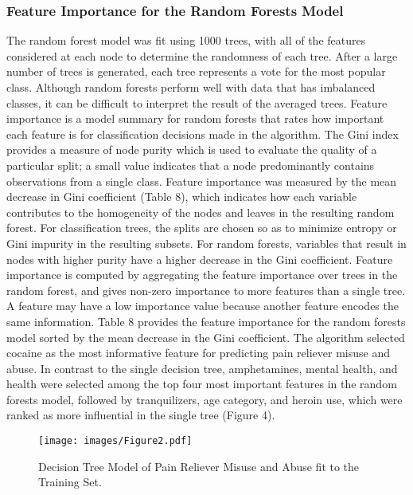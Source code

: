\documentclass[sigconf]{acmart}
\begin{document}
\subsubsection{Feature Importance for the Random Forests Model}

The random forest model was fit using 1000 trees, with all of the features 
considered at each node to determine the randomness of each tree. After a 
large number of trees is generated, each tree represents a vote for the
most popular class. Although random forests perform well with data that has
imbalanced classes, it can be difficult to interpret the result of the 
averaged trees. Feature importance is a model summary for random forests 
that rates how important each feature is for classification decisions made 
in the algorithm. The Gini index provides a measure of node purity which is 
used to evaluate the quality of a particular split; a small value indicates 
that a node predominantly contains observations from a single class. 
Feature importance was measured by the mean decrease in Gini coefficient 
(Table 8), which indicates how each variable contributes to the homogeneity 
of the nodes and leaves in the resulting random forest. For classification 
trees, the splits are chosen so as to minimize entropy or Gini impurity in 
the resulting subsets. For random forests, variables that result in nodes 
with higher purity have a higher decrease in the Gini coefficient. Feature 
importance is computed by aggregating the feature importance over trees in 
the random forest, and gives non-zero importance to more features than a 
single tree. A feature may have a low importance value because another feature 
encodes the same information. Table 8 provides the feature importance for 
the random forests model sorted by the mean decrease in the Gini coefficient. 
The algorithm selected cocaine as the most informative feature for predicting 
pain reliever misuse and abuse. In contrast to the single decision tree, 
amphetamines, mental health, and health were selected among the top four most 
important features in the random forests model, followed by tranquilizers, 
age category, and heroin use, which were ranked as more influential in the 
single tree (Figure 4). 

\begin{figure}[!ht]
  \centering\texttt{[image: images/Figure2.pdf]}
  \caption{Decision Tree Model of Pain Reliever Misuse and Abuse
  fit to the Training Set.}
  \label{f:Figure2}
\end{figure}
\end{document}
